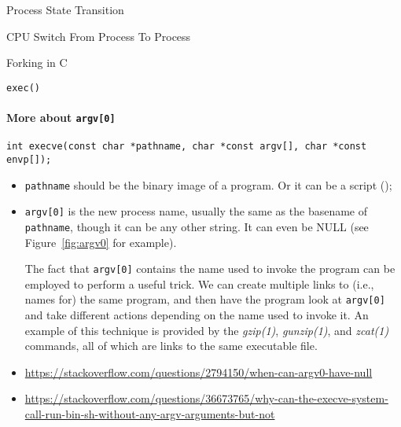 \begin{frame}{Process State Transition}
  \begin{center}
  \end{center}
\end{frame}

\begin{frame}{CPU Switch From Process To Process}
  \centering
  \mode<beamer>{ \texttt{[image: cpu-switch]} }%
\end{frame}

\begin{frame}{Forking in C}
  \centering
\end{frame}

\begin{frame}{\texttt{exec()}}
  \centering
\end{frame}

\paragraph{More about \texttt{argv[0]}}

\texttt{int execve(const char *pathname, char *const argv[], char *const envp[]);}
\begin{itemize}
\item \texttt{pathname} should be the binary image of a program. Or it can be a script
  ();
\item \texttt{argv[0]} is the new process name, usually the same as the basename of
  \texttt{pathname}, though it can be any other string. It can even be NULL (see
  Figure~\ref{fig:argv0} for example).

  The fact that \texttt{argv[0]} contains the name used to invoke the program can be
  employed to perform a useful trick. We can create multiple links to (i.e., names for)
  the same program, and then have the program look at \texttt{argv[0]} and take different
  actions depending on the name used to invoke it. An example of this technique is
  provided by the \emph{gzip(1)}, \emph{gunzip(1)}, and \emph{zcat(1)} commands, all of
  which are links to the same executable
  file. 
\item \url{https://stackoverflow.com/questions/2794150/when-can-argv0-have-null}
\item \url{https://stackoverflow.com/questions/36673765/why-can-the-execve-system-call-run-bin-sh-without-any-argv-arguments-but-not}
\end{itemize}

